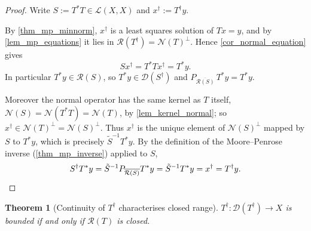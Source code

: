 \documentclass[a4paper]{report}
\theoremstyle{plain}
\newtheorem{theorem}{Theorem}[chapter]
\theoremstyle{definition}
\theoremstyle{remark}
\newcommand{\Ll}{\mathcal{L}}
\newcommand{\Ran}{\mathcal{R}}
\newcommand{\Ker}{\mathcal{N}}
\newcommand{\Dom}{\mathcal{D}}
\newcommand{\dg}{^{\dagger}}
\begin{document}
\begin{proof}
  Write $S := T^{*}T \in \Ll(X,X)$ and $x\dg := T\dg y$.

  By \cref{thm_mp_minnorm}, $x\dg$ is a least squares solution of $Tx = y$, and by
  \cref{lem_mp_equations} it lies in $\Ran(T\dg) = \Ker(T)^{\perp}$.  Hence
  \cref{cor_normal_equation} gives
  \[
    Sx\dg = T^{*}Tx\dg = T^{*}y .
  \]
  In particular $T^{*}y \in \Ran(S)$, so $T^{*}y \in \Dom(S\dg)$ and
  $P_{\overline{\Ran(S)}}\,T^{*}y = T^{*}y$.

  Moreover the normal operator has the same kernel as $T$ itself,
  $\Ker(S) = \Ker(T^{*}T) = \Ker(T)$, by \cref{lem_kernel_normal};
  so $x\dg \in \Ker(T)^{\perp} = \Ker(S)^{\perp}$.  Thus $x\dg$ is the unique element of
  $\Ker(S)^{\perp}$ mapped by $S$ to $T^{*}y$, which is precisely
  $\tilde{S}^{-1}T^{*}y$.  By the definition of the Moore--Penrose
  inverse (\cref{thm_mp_inverse}) applied to $S$,
  \[
    S\dg T^{*}y = \tilde{S}^{-1}P_{\overline{\Ran(S)}}T^{*}y
      = \tilde{S}^{-1}T^{*}y = x\dg = T\dg y . \qedhere
  \]
\end{proof}


\begin{theorem}[Continuity of $T\dg$ characterises closed range]
  \label{thm_mp_continuous_iff_closed_range}
  $T\dg \colon \Dom(T\dg) \to X$ is bounded if and only if $\Ran(T)$ is closed.
\end{theorem}
\end{document}

